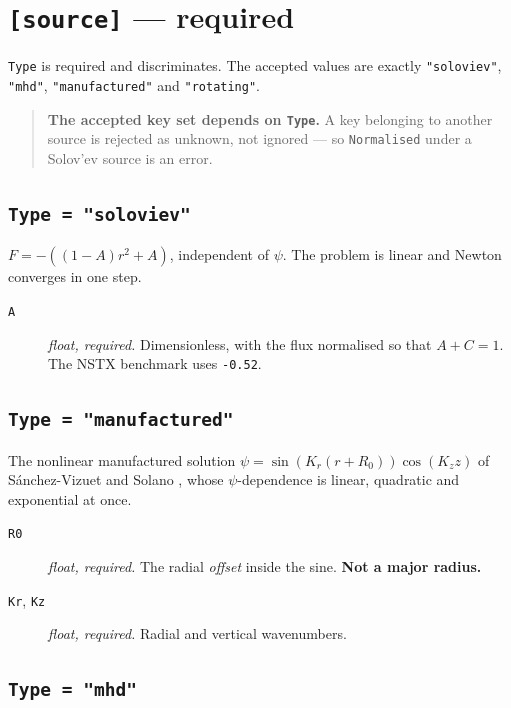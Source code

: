 \section{\texttt{[source]} --- required}

\texttt{Type} is required and discriminates. The accepted values are exactly
\texttt{"soloviev"}, \texttt{"mhd"}, \texttt{"manufactured"} and
\texttt{"rotating"}.

\begin{quote}
	\textbf{The accepted key set depends on \texttt{Type}.} A key belonging to
	another source is rejected as unknown, not ignored --- so
	\texttt{Normalised} under a Solov'ev source is an error.
\end{quote}

\subsection{\texttt{Type = "soloviev"}}

$F = -\left((1-A)r^{2} + A\right)$, independent of $\psi$. The problem is linear
and Newton converges in one step.

\begin{description}
\item[\texttt{A}] \emph{float, required.} Dimensionless, with the flux
	normalised so that $A + C = 1$. The NSTX benchmark uses \texttt{-0.52}.
\end{description}

\subsection{\texttt{Type = "manufactured"}}

The nonlinear manufactured solution $\psi = \sin(K_r(r + R_0))\cos(K_z z)$ of
S\'anchez-Vizuet and Solano \cite{SanchezVizuetSolano2019}, whose
$\psi$-dependence is linear, quadratic and exponential at once.

\begin{description}
\item[\texttt{R0}] \emph{float, required.} The radial \emph{offset} inside the
	sine. \textbf{Not a major radius.}
\item[\texttt{Kr}, \texttt{Kz}] \emph{float, required.} Radial and vertical
	wavenumbers.
\end{description}

\subsection{\texttt{Type = "mhd"}}

